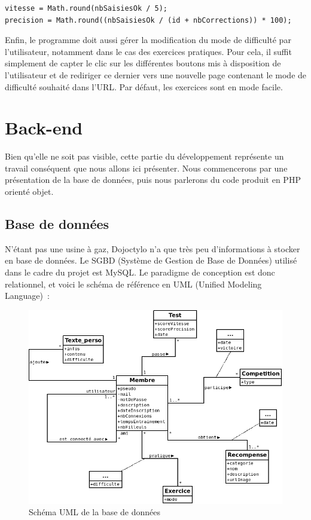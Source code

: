 \documentclass[a4paper,12pt]{article}
\begin{document}
\begin{lstlisting}
vitesse = Math.round(nbSaisiesOk / 5);
precision = Math.round((nbSaisiesOk / (id + nbCorrections)) * 100);
\end{lstlisting}

Enfin, le programme doit aussi gérer la modification du mode de difficulté par l'utilisateur, notamment dans le cas des exercices pratiques. Pour cela, il suffit simplement de capter le clic sur les différentes boutons mis à disposition de l'utilisateur et de rediriger ce dernier vers une nouvelle page contenant le mode de difficulté souhaité dans l'URL. Par défaut, les exercices sont en mode facile.

\section{Back-end}

Bien qu'elle ne soit pas visible, cette partie du développement représente un travail conséquent que nous allons ici présenter. Nous commencerons par une présentation de la base de données, puis nous parlerons du code produit en PHP orienté objet.

\subsection{Base de données}

N'étant pas une usine à gaz, Dojoctylo n'a que très peu d'informations à stocker en base de données. Le SGBD (Système de Gestion de Base de Données) utilisé dans le cadre du projet est MySQL. Le paradigme de conception est donc relationnel, et voici le schéma de référence en UML (Unified Modeling Language)~:

\begin{figure}[!h]
\begin{center}
\includegraphics[scale=0.5]{bdd.png}
\end{center}
\caption{Schéma UML de la base de données}
\end{figure}
\end{document}
